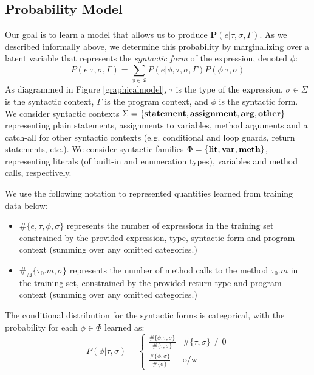 \documentclass{article} %
\begin{document}
\newcommand{\nm}[1]{\#\{#1\}}
\newcommand{\nmm}[1]{\#_M\{#1\}}

\subsection*{Probability Model}
      Our goal is to learn a model that allows us to produce $\mathbf{P}(e|\tau, \sigma, \Gamma)$. As we described informally above, we determine this probability by marginalizing over a latent variable that represents the \emph{syntactic form} of the expression, denoted $\phi$:
    $$P(e | \tau, \sigma, \Gamma) = \sum_{\phi \in \Phi} P(e | \phi, \tau, \sigma, \Gamma) P(\phi | \tau, \sigma)$$
As diagrammed in Figure \ref{graphicalmodel}, $\tau$ is the type of the expression, $\sigma \in \Sigma$ is the syntactic context, $\Gamma$ is the program context, and $\phi$ is the syntactic form. We consider syntactic contexts $\Sigma = \{\textbf{statement}, \textbf{assignment}, \textbf{arg}, \textbf{other}\}$ representing plain statements, assignments to variables, method arguments and a catch-all for other syntactic contexts (e.g. conditional and loop guards, return statements, etc.). We consider syntactic families $\Phi = \{\textbf{lit}, \textbf{var}, \textbf{meth}\}$, representing literals (of built-in and enumeration types), variables and method calls, respectively. 

	  We use the following notation to represented quantities learned from training data below:
	  \begin{itemize}
	  \item $\nm{e, \tau, \phi, \sigma}$ represents the number of expressions in the training set constrained by the provided expression, type, syntactic form and program context (summing over any omitted categories.)
	  \item $\nmm{\tau_0.m, \sigma}$ represents the number of method calls to the method $\tau_0.m$ in the training set, constrained by the provided return type and program context (summing over any omitted categories.)
  	  \end{itemize}
  
  The conditional distribution for the syntactic forms is categorical, with the probability for each $\phi \in \Phi$ learned as:
  $$P(\phi | \tau, \sigma) = 
  \left\{
  	\begin{array}{ll}
	 	\frac{\nm{\phi,\tau, \sigma}}{\nm{\tau, \sigma}} & \nm{\tau, \sigma} \neq 0\\
		\frac{\nm{\phi, \sigma}}{\nm{\sigma}} & \mbox{o/w}
	\end{array}
	\right.
  $$
  
\end{document}
